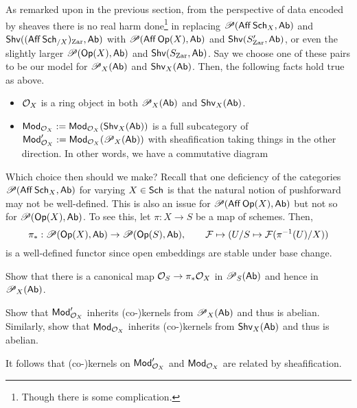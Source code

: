 \documentclass[11pt]{article}
\renewcommand{\F}{\mathcal{F}}
\begin{document}
As remarked upon in the previous section, from the perspective of data encoded by sheaves there is no real harm done\footnote{Though there is some complication.} in replacing $\Pre(\Aff\Sch_X,\Ab)$ and $\Shv((\Aff\Sch_{/X})_{\Zar},\Ab)$ with $\Pre(\Aff\Op(X),\Ab)$ and $\Shv(S'_{\Zar},\Ab)$, or even the slightly larger $\Pre(\Op(X),\Ab)$ and $\Shv(S_{\Zar},\Ab)$. Say we choose one of these pairs to be our model for $\Pre_X(\Ab)$ and $\Shv_X(\Ab)$. Then, the following facts hold true as above.
\begin{itemize}
\item $\O_X$ is a ring object in both $\Pre_X(\Ab)$ and $\Shv_X(\Ab)$.

\item $\Mod_{\O_X}:=\Mod_{\O_X}(\Shv_X(\Ab))$ is a full subcategory of $\Mod'_{\O_X}:=\Mod_{\O_X}(\Pre_X(\Ab))$ with sheafification taking things in the other direction. In other words, we have a commutative diagram
\begin{center}
\end{center}
\end{itemize}
Which choice then should we make? Recall that one deficiency of the categories $\Pre(\Aff\Sch_X,\Ab)$ for varying $X\in\Sch$ is that the natural notion of pushforward may not be well-defined. This is also an issue for $\Pre(\Aff\Op(X),\Ab)$ but not so for $\Pre(\Op(X),\Ab)$. To see this, let $\pi: X\to S$ be a map of schemes. Then, 
$$\pi_*: \Pre(\Op(X),\Ab)\to\Pre(\Op(S),\Ab),\qquad \F\mapsto(U/S\mapsto\F(\pi^{-1}(U)/X))$$
is a well-defined functor since open embeddings are stable under base change.

\begin{exercise}
Show that there is a canonical map $\O_S\to\pi_*\O_X$ in $\Pre_S(\Ab)$ and hence in $\Pre_X(\Ab)$.
\end{exercise}

\begin{exercise}
Show that $\Mod'_{\O_X}$ inherits (co-)kernels from $\Pre_X(\Ab)$ and thus is abelian. Similarly, show that $\Mod_{\O_X}$ inherits (co-)kernels from $\Shv_X(\Ab)$ and thus is abelian.
\end{exercise}

\begin{remark}
It follows that (co-)kernels on $\Mod'_{\O_X}$ and $\Mod_{\O_X}$ are related by sheafification.
\end{remark}
\end{document}

